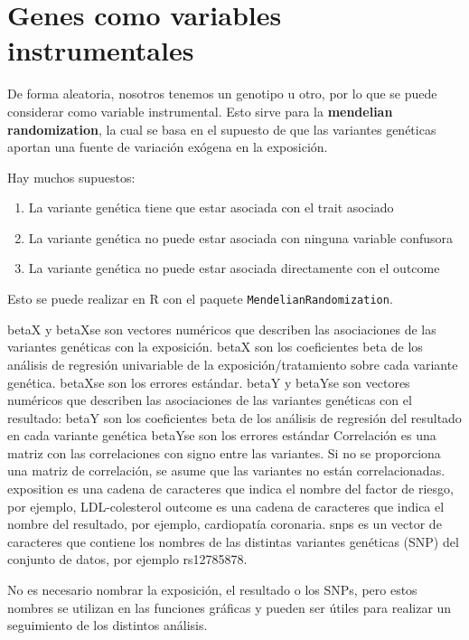 \section{Genes como variables instrumentales}
De forma aleatoria, nosotros tenemos un genotipo u otro, por lo que se puede considerar como variable instrumental. Esto sirve para la \textbf{mendelian randomization}, la cual se basa en el supuesto de que las variantes genéticas aportan una fuente de variación exógena en la exposición.

Hay muchos supuestos:
\begin{enumerate}
\item La variante genética tiene que estar asociada con el trait asociado
\item La variante genética no puede estar asociada con ninguna variable confusora
\item La variante genética no puede estar asociada directamente con el outcome
\end{enumerate}

Esto se puede realizar en R con el paquete \texttt{MendelianRandomization}.

betaX y betaXse son vectores numéricos que describen las asociaciones de las variantes genéticas con la exposición. 
betaX son los coeficientes beta de los análisis de regresión univariable de la exposición/tratamiento sobre cada variante genética. 
betaXse son los errores estándar.
betaY y betaYse son vectores numéricos que describen las asociaciones de las variantes genéticas con el resultado: 
betaY son los coeficientes beta de los análisis de regresión del resultado en cada variante genética 
betaYse son los errores estándar
Correlación es una matriz con las correlaciones con signo entre las variantes. Si no se proporciona una matriz de correlación, se asume que las variantes no están correlacionadas.
exposition es una cadena de caracteres que indica el nombre del factor de riesgo, por ejemplo, LDL-colesterol
outcome es una cadena de caracteres que indica el nombre del resultado, por ejemplo, cardiopatía coronaria. 
snps es un vector de caracteres que contiene los nombres de las distintas variantes genéticas (SNP) del conjunto de datos, por ejemplo rs12785878. 

No es necesario nombrar la exposición, el resultado o los SNPs, pero estos nombres se utilizan en las funciones gráficas y pueden ser útiles para realizar un seguimiento de los distintos análisis.
